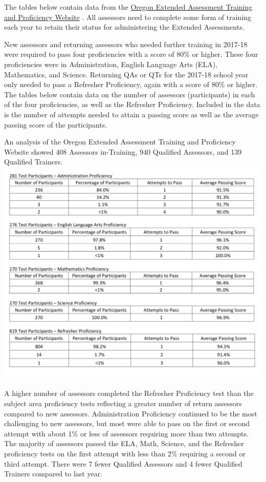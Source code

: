 \documentclass[]{article}
\begin{document}
The tables below contain data from the
\color{link}\href{http://or.k12test.com/}{Oregon Extended Assessment
Training and Proficiency Website} \color{black}. All assessors need to
complete some form of training each year to retain their status for
administering the Extended Assessments.

New assessors and returning assessors who needed further training in
2017-18 were required to pass four proficiencies with a score of 80\% or
higher. These four proficiencies were in Administration, English
Language Arts (ELA), Mathematics, and Science. Returning QAs or QTs for
the 2017-18 school year only needed to pass a Refresher Proficiency,
again with a score of 80\% or higher. The tables below contain data on
the number of assessors (participants) in each of the four
proficiencies, as well as the Refresher Proficiency. Included in the
data is the number of attempts needed to attain a passing score as well
as the average passing score of the participants.

An analysis of the Oregon Extended Assessment Training and Proficiency
Website showed 408 Assessors in-Training, 940 Qualified Assessors, and
139 Qualified Trainers. \FloatBarrier
\includegraphics{Figures/TestPartic/TestParticipants.png}

A higher number of assessors completed the Refresher Proficiency test
than the subject area proficiency tests reflecting a greater number of
return assessors compared to new assessors. Administration Proficiency
continued to be the most challenging to new assessors, but most were
able to pass on the first or second attempt with about 1\% or less of
assessors requiring more than two attempts. The majority of assessors
passed the ELA, Math, Science, and the Refresher proficiency tests on
the first attempt with less than 2\% requiring a second or third
attempt. There were 7 fewer Qualified Assessors and 4 fewer Qualified
Trainers compared to last year.
\end{document}
